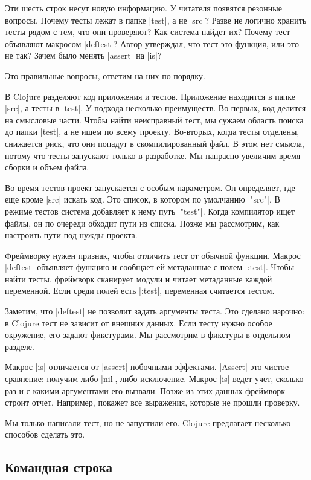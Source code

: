 Эти шесть строк несут новую информацию. У читателя появятся резонные
вопросы. Почему тесты лежат в папке \spverb|test|, а не \spverb|src|? Разве не
логично хранить тесты рядом с тем, что они проверяют? Как система найдет их?
Почему тест объявляют макросом \spverb|deftest|? Автор утверждал, что тест это
функция, или это не так? Зачем было менять \spverb|assert| на \spverb|is|?

Это правильные вопросы, ответим на них по порядку.

В Clojure разделяют код приложения и тестов. Приложение находится в папке
\spverb|src|, а тесты в \spverb|test|. У подхода несколько
преимуществ. Во-первых, код делится на смысловые части. Чтобы найти неисправный
тест, мы сужаем область поиска до папки \spverb|test|, а не ищем по всему
проекту. Во-вторых, когда тесты отделены, снижается риск, что они попадут в
скомпилированный файл. В этом нет смысла, потому что тесты запускают только в
разработке. Мы напрасно увеличим время сборки и объем файла.

Во время тестов проект запускается с особым параметром. Он определяет, где еще
кроме \spverb|src| искать код. Это список, в котором по умолчанию
\spverb|"src"|. В режиме тестов система добавляет к нему путь
\spverb|"test"|. Когда компилятор ищет файлы, он по очереди обходит пути из
списка. Позже мы рассмотрим, как настроить пути под нужды проекта.

Фреймворку нужен признак, чтобы отличить тест от обычной функции. Макрос
\spverb|deftest| объявляет функцию и сообщает ей метаданные с полем
\spverb|:test|. Чтобы найти тесты, фреймворк сканирует модули и читает
метаданные каждой переменной. Если среди полей есть \spverb|:test|, переменная
считается тестом.

Заметим, что \spverb|deftest| не позволит задать аргументы теста. Это сделано
нарочно: в Clojure тест не зависит от внешних данных. Если тесту нужно особое
окружение, его задают фикстурами. Мы рассмотрим в фикстуры в отдельном разделе.

Макрос \spverb|is| отличается от \spverb|assert| побочными
эффектами. \spverb|Assert| это чистое сравнение: получим либо \spverb|nil|, либо
исключение. Макрос \spverb|is| ведет учет, сколько раз и с какими аргументами
его вызвали. Позже из этих данных фреймворк строит отчет. Например, покажет все
выражения, которые не прошли проверку.

Мы только написали тест, но не запустили его. Clojure предлагает несколько
способов сделать это.

\subsection{Командная строка}

